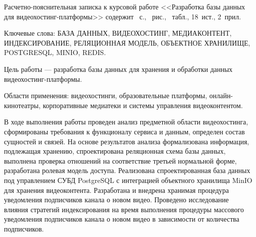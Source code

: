 
Расчетно-пояснительная записка к курсовой работе <<Разработка базы данных для видеохостинг-платформы>> содержит \pageref{LastPage}~с., \totalfigures{}~рис., \totaltables{}~табл., 18~ист., 2~прил.

Ключевые слова: БАЗА ДАННЫХ, ВИДЕОХОСТИНГ, МЕДИАКОНТЕНТ, ИНДЕКСИРОВАНИЕ, РЕЛЯЦИОННАЯ МОДЕЛЬ, ОБЪЕКТНОЕ ХРАНИЛИЩЕ, POSTGRESQL, MINIO, REDIS.

Цель работы --- разработка базы данных для хранения и обработки данных видеохостинг-платформы.

Области применения: видеохостинги, образовательные платформы, онлайн-кинотеатры, корпоративные медиатеки и системы управления видеоконтентом.

В ходе выполнения работы проведен анализ предметной области видеохостинга, сформированы требования к функционалу сервиса и данным, определен состав сущностей и связей.
На основе результатов анализа формализована информация, подлежащая хранению, спроектирована реляционная схема базы данных, выполнена проверка отношений на соответствие третьей нормальной форме, разработана ролевая модель доступа.
Реализована спроектированная база данных под управлением СУБД PostgreSQL с интеграцией объектного хранилища MinIO для хранения видеоконтента.
Разработана и внедрена хранимая процедура уведомления подписчиков канала о новом видео.
Проведено исследование влияния стратегий индексирования на время выполнения процедуры массового уведомления подписчиков канала о новом видео в зависимости от количества подписчиков.
